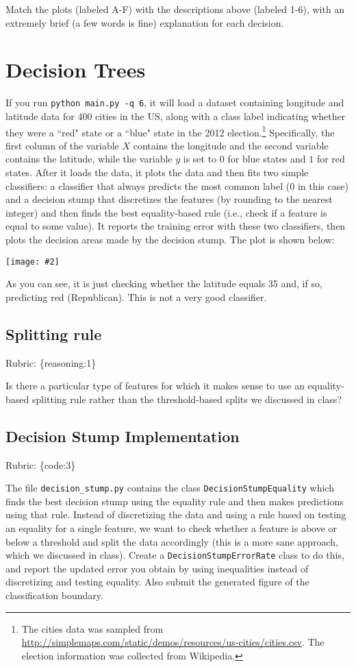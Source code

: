 \documentclass{article}
\def\rubric#1{\gre{Rubric: \{#1\}}}{}
\def\blu#1{{\color{blu}#1}}
\def\gre#1{{\color{gre}#1}}
\newcommand{\centerfig}[2]{\begin{center}\texttt{[image: \#2]}\end{center}}
\begin{document}
\blu{Match the plots (labeled A-F) with the descriptions above (labeled 1-6), with an extremely brief (a few words is fine) explanation for each decision.}



\section{Decision Trees}

If you run \texttt{python main.py -q 6}, it will load a dataset containing longitude 
and latitude data for 400 cities in the US, along with a class label indicating
 whether they were a ``red" state or a ``blue" state in the 2012 
 election.\footnote{The cities data was sampled from \url{http://simplemaps.com/static/demos/resources/us-cities/cities.csv}. The election information was collected from Wikipedia.}
Specifically, the first column of the variable $X$ contains the 
longitude and the second variable contains the latitude,
while the variable $y$ is set to $0$ for blue states and $1$ for red states.
After it loads the data, it plots the data and then fits two simple 
classifiers: a classifier that always predicts the
most common label ($0$ in this case) and a decision stump
that discretizes the features (by rounding to the nearest integer)
and then finds the best equality-based rule (i.e., check
 if a feature is equal to some value).
It reports the training error with these two classifiers, then plots the decision areas made by the decision stump.
The plot is shown below:

\centerfig{0.7}{../figs/q6_decisionBoundary}

As you can see, it is just checking whether the latitude equals 35 and, if so, predicting red (Republican).
This is not a very good classifier. 

\subsection{Splitting rule}
\rubric{reasoning:1}

Is there a particular type of features for which it makes sense to use an equality-based splitting rule rather than the threshold-based splits we discussed in class?

\subsection{Decision Stump Implementation}
\rubric{code:3}

The file \texttt{decision\string_stump.py} contains the class \texttt{DecisionStumpEquality} which 
finds the best decision stump using the equality rule and then makes predictions using that
rule. Instead of discretizing the data and using a rule based on testing an equality for 
a single feature, we want to check whether a feature is above or below a threshold and 
split the data accordingly (this is a more sane approach, which we discussed in class). 
\blu{Create a \texttt{DecisionStumpErrorRate} class to do this, and report the updated error you 
obtain by using inequalities instead of discretizing and testing equality. Also submit the generated figure of the classification boundary.}
\end{document}
